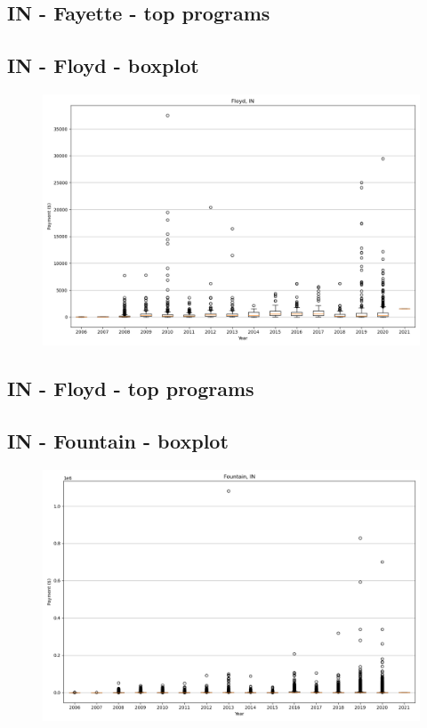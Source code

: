 \subsection*{IN - Fayette - top programs}

\newpage
\subsection*{IN - Floyd - boxplot}
\begin{figure}[h]
\centering
\includegraphics[width=7in]{../output/boxplots/counties/Floyd-IN_boxplot.png}
\end{figure}


\subsection*{IN - Floyd - top programs}

\newpage
\subsection*{IN - Fountain - boxplot}
\begin{figure}[h]
\centering
\includegraphics[width=7in]{../output/boxplots/counties/Fountain-IN_boxplot.png}
\end{figure}


